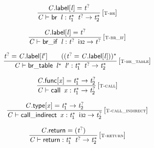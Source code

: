 \vspace{1ex}

$$
\begin{array}{@{}c@{}}\displaystyle
\frac{
{\mathit{C}}.\mathsf{label}{}[{\mathit{l}}] = {{\mathit{t}}^?}
}{
{\mathit{C}} \vdash \mathsf{br}~\,{\mathit{l}} : {{\mathit{t}}_{{1}}^\ast}~\,{{\mathit{t}}^?} \rightarrow {{\mathit{t}}_{{2}}^\ast}
} \, {[\textsc{\scriptsize T{-}br}]}
\qquad
\end{array}
$$

$$
\begin{array}{@{}c@{}}\displaystyle
\frac{
{\mathit{C}}.\mathsf{label}{}[{\mathit{l}}] = {{\mathit{t}}^?}
}{
{\mathit{C}} \vdash \mathsf{br\_if}~\,{\mathit{l}} : {{\mathit{t}}^?}~\,\mathsf{i{\scriptstyle32}} \rightarrow {{\mathit{t}}^?}
} \, {[\textsc{\scriptsize T{-}br\_if}]}
\qquad
\end{array}
$$

$$
\begin{array}{@{}c@{}}\displaystyle
\frac{
{{\mathit{t}}^?} = {\mathit{C}}.\mathsf{label}{}[{\mathit{l}'}]
 \qquad
(({{\mathit{t}}^?} = {\mathit{C}}.\mathsf{label}{}[{\mathit{l}}]))^\ast
}{
{\mathit{C}} \vdash \mathsf{br\_table}~\,{{\mathit{l}}^\ast}~\,{\mathit{l}'} : {{\mathit{t}}_{{1}}^\ast}~\,{{\mathit{t}}^?} \rightarrow {{\mathit{t}}_{{2}}^\ast}
} \, {[\textsc{\scriptsize T{-}br\_table}]}
\qquad
\end{array}
$$

\vspace{1ex}

$$
\begin{array}{@{}c@{}}\displaystyle
\frac{
{\mathit{C}}.\mathsf{func}{}[{\mathit{x}}] = {{\mathit{t}}_{{1}}^\ast} \rightarrow {{\mathit{t}}_{{2}}^?}
}{
{\mathit{C}} \vdash \mathsf{call}~\,{\mathit{x}} : {{\mathit{t}}_{{1}}^\ast} \rightarrow {{\mathit{t}}_{{2}}^?}
} \, {[\textsc{\scriptsize T{-}call}]}
\qquad
\end{array}
$$

$$
\begin{array}{@{}c@{}}\displaystyle
\frac{
{\mathit{C}}.\mathsf{type}{}[{\mathit{x}}] = {{\mathit{t}}_{{1}}^\ast} \rightarrow {{\mathit{t}}_{{2}}^?}
}{
{\mathit{C}} \vdash \mathsf{call\_indirect}~\,{\mathit{x}} : {{\mathit{t}}_{{1}}^\ast}~\,\mathsf{i{\scriptstyle32}} \rightarrow {{\mathit{t}}_{{2}}^?}
} \, {[\textsc{\scriptsize T{-}call\_indirect}]}
\qquad
\end{array}
$$

$$
\begin{array}{@{}c@{}}\displaystyle
\frac{
{\mathit{C}}.\mathsf{return} = ({{\mathit{t}}^?})
}{
{\mathit{C}} \vdash \mathsf{return} : {{\mathit{t}}_{{1}}^\ast}~\,{{\mathit{t}}^?} \rightarrow {{\mathit{t}}_{{2}}^\ast}
} \, {[\textsc{\scriptsize T{-}return}]}
\qquad
\end{array}
$$

